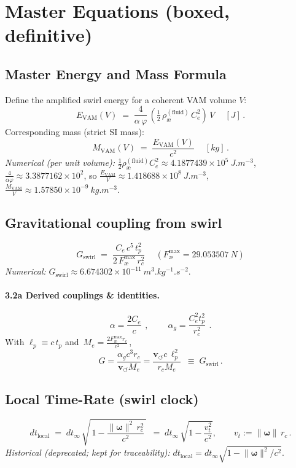 \documentclass[11pt,a4paper]{article}
\newcommand{\aeether}{\text{\ae}} %
\begin{document}
    \section{Master Equations (boxed, definitive)}
    \subsection{Master Energy and Mass Formula}
    Define the amplified swirl energy for a coherent VAM volume $V$:
    \[
        \boxed{\ E_{\mathrm{VAM}}(V) \;=\; \frac{4}{\alpha\,\varphi}\,\left(\tfrac{1}{2}\,\rho_{\aeether}^{(\mathrm{fluid})}\,C_e^{2}\right)\,V\ }\quad [\si{J}]\,.
    \]
    Corresponding mass (strict SI mass):
    \[
        \boxed{\ M_{\mathrm{VAM}}(V) \;=\; \frac{E_{\mathrm{VAM}}(V)}{c^{2}} \ }\quad [\si{kg}]\,.
    \]
    \noindent\textit{Numerical (per unit volume):} $\tfrac{1}{2}\rho_{\aeether}^{(\mathrm{fluid})}C_e^2 \approx 4.1877439\times 10^{5}\ \si{J.m^{-3}}$, $\frac{4}{\alpha\varphi} \approx 3.3877162\times 10^{2}$, so $\frac{E_{\mathrm{VAM}}}{V} \approx 1.418688\times 10^{8}\ \si{J.m^{-3}}$, $\frac{M_{\mathrm{VAM}}}{V} \approx 1.57850\times 10^{-9}\ \si{kg.m^{-3}}$.

    \subsection{Gravitational coupling from swirl}
    \[
        \boxed{\ G_{\mathrm{swirl}} \;=\; \frac{C_e\,c^{5}\,t_p^{2}}{2\,F_{\aeether}^{\max}\,r_c^{2}}\ }\quad (F_{\aeether}^{\max}=29.053507\ \si{N})
    \]
    \noindent\textit{Numerical:} $G_{\mathrm{swirl}} \approx 6.674302\times 10^{-11}\ \si{m^{3}.kg^{-1}.s^{-2}}$.

    \paragraph{3.2a Derived couplings \& identities.}
    \[
        \boxed{\ \alpha = \frac{2 C_e}{c}\ }\,,\qquad \boxed{\ \alpha_g = \frac{C_e^{2} t_p^{2}}{r_c^{2}}\ }\,.
    \]
    With $\ell_p\equiv c\,t_p$ and $ \boxed{\,M_e = \tfrac{2 F_{\aeether}^{\max} r_c}{c^{2}}\,}$,
    \[
        \boxed{\ G = \frac{\alpha_g c^{3} r_c}{\mathbf{v}_{\scriptscriptstyle\boldsymbol{\circlearrowleft}} M_e} = \frac{\mathbf{v}_{\scriptscriptstyle\boldsymbol{\circlearrowleft}} c\, \ell_p^{2}}{r_c M_e}\ }\;\equiv\; G_{\mathrm{swirl}}\,.
    \]

    \subsection{Local Time-Rate (swirl clock)}
    \[
        \boxed{\ dt_{\mathrm{local}} \;=\; dt_{\infty}\,\sqrt{\,1 - \frac{\lVert\bm{\omega}\rVert^{2}\,r_c^{2}}{c^{2}}\,}\ }
        \;=\; dt_{\infty}\,\sqrt{1-\frac{v_t^2}{c^2}},\qquad v_t:=\lVert\bm{\omega}\rVert\,r_c\,.
    \]
    \noindent\emph{Historical (deprecated; kept for traceability):} $dt_{\mathrm{local}} = dt_{\infty}\sqrt{1-\lVert\bm{\omega}\rVert^{2}/c^{2}}$.
\end{document}
